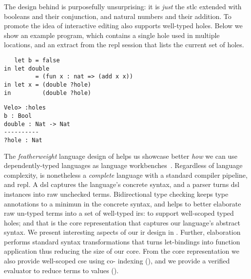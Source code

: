 The design behind \Velo{} is purposefully unsurprising:
%
it is \emph{just} the \ac{stlc} extended with booleans and their conjunction, and natural numbers and their addition.
%
To promote the idea of interactive editing \Velo{} also supports well-typed holes.
%
Below we show an example \Velo{} program, which contains a single hole used in multiple locations, and an extract from the \acs*{repl}
session that lists the current set of holes.

\begin{center}
  \begin{minipage}[t]{0.55\linewidth}
\begin{Verbatim}
   let b = false
in let double
         = (fun x : nat => (add x x))
in let x = (double ?hole)
in         (double ?hole)
\end{Verbatim}
\end{minipage}
\hfill
  \begin{minipage}[t]{0.35\linewidth}
    \begin{Verbatim}
Velo> :holes
b : Bool
double : Nat -> Nat
----------
?hole : Nat
\end{Verbatim}
\end{minipage}

\end{center}

The \emph{featherweight} language design of \Velo{} helps us showcase better \emph{how} we can use dependently-typed languages as language workbenches~\cite{DBLP:journals/toplas/IgarashiPW01}.
%
Regardless of language complexity, \Velo{} is nonetheless a \emph{complete} language with a standard compiler pipeline, and \acs*{repl}.
%
A \ac{dsl} captures the language's concrete syntax, and a parser turns \ac{dsl} instances into raw unchecked terms.
%
Bidirectional type checking keeps type annotations to a minimun in the concrete syntax, and helps to better elaborate raw un-typed terms into a set of well-typed \acp{ir}:
%
 to support well-scoped typed holes;
%
and
%
 that is the core representation that captures our language's abstract syntax.
%
We present interesting aspects of our \ac{ir} design in .
%
Further, elaboration performs standard syntax transformations that turns let-bindings into function application thus reducing the size of our core.
%
From the core representation we also provide well-scoped \ac{cse} using co-\DeBruijn{} indexing (), and we provide a verified evaluator to reduce terms to values ().



